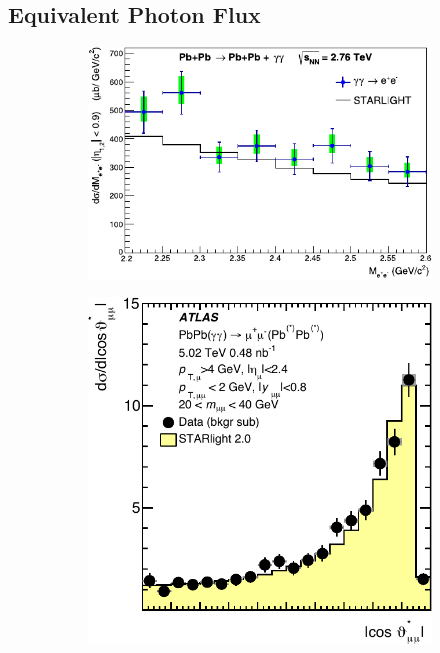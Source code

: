 \documentclass[twocolumn,epjc3]{svjour3}\sloppy
\begin{document}
\subsection{Equivalent Photon Flux}

\begin{figure}
    \centering
    \begin{subfigure}{.60\textwidth}
      \centering
      \includegraphics[width=.99\linewidth]{fig/fig_5-crop.pdf}
      \caption{}
    \end{subfigure}%
    \begin{subfigure}{.40\textwidth}
      \centering
      \includegraphics[width=.99\linewidth]{fig/ATLAS_Fig_1b-crop.pdf}

\end{subfigure}
\end{figure}
\end{document}
